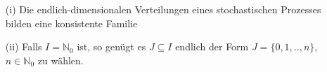 \mbox{}
\begin{itemize}
\item[(i)] Die endlich-dimensionalen Verteilungen eines stochastischen Prozesses bilden eine konsistente Familie
\item[(ii)] Falls $I = \mathbb{N}_{0}$ ist, so genügt es $J \subseteq I $ endlich der Form $ J = \lbrace 0,1,..,n \rbrace$, $n \in \mathbb{N}_{0}$ zu wählen.
\end{itemize}